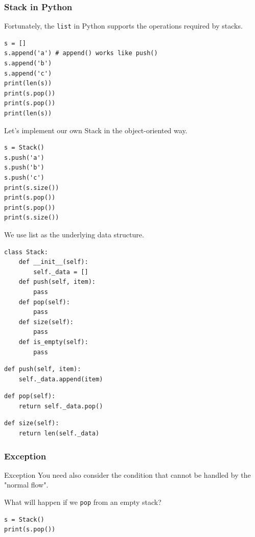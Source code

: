 \documentclass[aspectratio=169, 14pt]{beamer}
\begin{document}
\begin{frame}[fragile]
	\frametitle{Stack in Python}
	Fortunately, the \texttt{list} in Python supports the operations required by stacks.
	\begin{verbatim}
s = []
s.append('a') # append() works like push()
s.append('b')
s.append('c')
print(len(s))
print(s.pop())
print(s.pop())
print(len(s))
\end{verbatim}

\end{frame}

\begin{frame}[fragile]
	Let's implement our own \alert{Stack} in the object-oriented way.
	\begin{verbatim}
s = Stack()
s.push('a')
s.push('b')
s.push('c')
print(s.size())
print(s.pop())
print(s.pop())
print(s.size())
\end{verbatim}

\end{frame}

\begin{frame}[fragile]
	We use \alert{list} as the underlying data structure.
	\begin{verbatim}
class Stack:
    def __init__(self):
        self._data = []
    def push(self, item):
        pass
    def pop(self):
        pass
    def size(self):
        pass
    def is_empty(self):
        pass
\end{verbatim}

\end{frame}

\begin{frame}[fragile]
	\begin{verbatim}
def push(self, item):
    self._data.append(item)    
\end{verbatim}

	\begin{verbatim}
def pop(self):
    return self._data.pop()   
\end{verbatim}

	\begin{verbatim}
def size(self):
    return len(self._data)    
    \end{verbatim}
\end{frame}

\begin{frame}[fragile]
	\frametitle{Exception}
	\begin{block}{Exception}
		You need also consider the condition that cannot be handled by the "normal flow".
	\end{block}

	{\large {}} What will happen if we \texttt{pop} from an empty stack?
	\begin{verbatim}
s = Stack()
print(s.pop())
\end{verbatim}

\end{frame}
\end{document}
